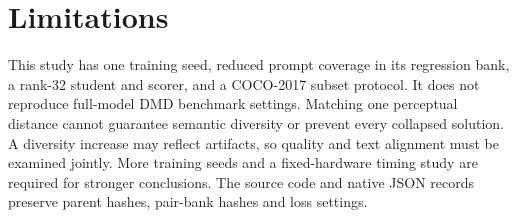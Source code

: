 \documentclass[10pt,twocolumn,letterpaper]{article}
\begin{document}
\section{Limitations}
This study has one training seed, reduced prompt coverage in its regression
bank, a rank-32 student and scorer, and a COCO-2017 subset protocol. It does
not reproduce full-model DMD benchmark settings. Matching one perceptual
distance cannot guarantee semantic diversity or prevent every collapsed
solution. A diversity increase may reflect artifacts, so quality and text
alignment must be examined jointly. More training seeds and a fixed-hardware
timing study are required for stronger conclusions. The source code and native
JSON records preserve parent hashes, pair-bank hashes and loss settings.


\end{document}
